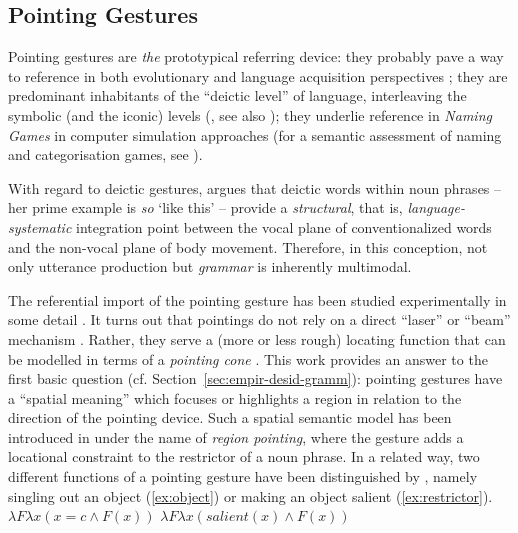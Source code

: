 \documentclass[output=paper
 	        ,biblatex
                ,babelshorthands
                ,newtxmath
                ,draftmode
                ,colorlinks, citecolor=brown
]{langscibook}
\begin{document}
\subsection{Pointing Gestures}
\label{sec:pointing-gestures}

Pointing gestures are \emph{the} prototypical referring device:
%
they probably pave a way to reference in both evolutionary and language acquisition perspectives \citep{Bruner:1998,Masataka:2003,Matthews:Behne:Lieven:Tomasello:2012};
%
they are predominant inhabitants of the \enquote{deictic level} of language, interleaving the symbolic (and the iconic) levels (\citealp{Levinson:2008}, see also \citealp{Buehler:1934:ORIG});
%
they underlie reference in \textit{Naming Games} in computer simulation approaches \citep{Steels:1995} (for a semantic assessment of naming and categorisation games, see \citealp{Luecking:Mehler:2012}).


With regard to deictic gestures, \citet[Section~5.4]{Fricke:2012} argues that deictic words within noun phrases -- her prime example is  \emph{so} `like this' -- provide a \emph{structural}, that is, \emph{language-systematic} integration point between the vocal plane of conventionalized words and the non-vocal plane of body movement.
%
Therefore, in this conception, not only utterance production but \emph{grammar} is inherently multimodal.

The referential import of the pointing gesture has been studied experimentally in some detail \citep{Bangerter:Oppenheimer:2006,Kranstedt:Luecking:Pfeiffer:Rieser:Wachsmuth:2006:a,Kranstedt:Luecking:Pfeiffer:Rieser:Wachsmuth:2006:b,van:der:Sluis:Krahmer:2007}. 
%
It turns out that pointings do not rely on a direct \enquote{laser} or \enquote{beam} mechanism \citep{McGinn:1981}.
%
Rather, they serve a (more or less rough) locating function \citep{Clark:1996} that can be modelled in terms of a \emph{pointing cone} \citep{Kranstedt:Luecking:Pfeiffer:Rieser:Wachsmuth:2006:a,Luecking:Pfeiffer:Rieser:2015}.
%
This work provides an answer to the first basic question (cf. Section~\ref{sec:empir-desid-gramm}): pointing gestures have a \enquote{spatial meaning} which focuses or highlights a region in relation to the direction of the pointing device.
%
Such a spatial semantic model has been introduced in \citet{Rieser:2004} under the name of \emph{region pointing}, where the gesture adds a locational constraint to the restrictor of a noun phrase.
%
In a related way, two different functions of a pointing gesture have been distinguished by \citet{Kuehnlein:Nimke:Stegmann:2002}, namely singling out an object (\ref{ex:object}) or making an object salient (\ref{ex:restrictor}).
%
\ea \label{ex:pointing-functions}
\ea \label{ex:object}
$\lambda F \lambda x (x = c \wedge F(x))$
\ex \label{ex:restrictor}
$\lambda F \lambda x (\textit{salient}(x) \wedge F(x))$
\z 
\z
\end{document}

